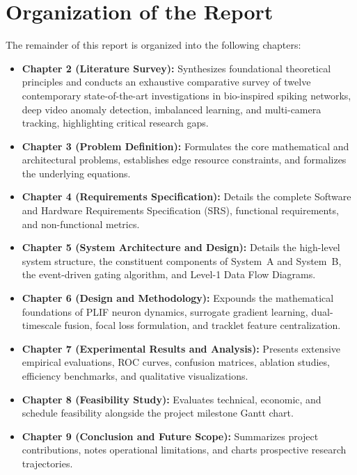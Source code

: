 \documentclass[12pt,a4paper]{report}
\begin{document}
\section{Organization of the Report}
The remainder of this report is organized into the following chapters:
\begin{itemize}
    \item \textbf{Chapter 2 (Literature Survey):} Synthesizes foundational theoretical principles and conducts an exhaustive comparative survey of twelve contemporary state-of-the-art investigations in bio-inspired spiking networks, deep video anomaly detection, imbalanced learning, and multi-camera tracking, highlighting critical research gaps.
    \item \textbf{Chapter 3 (Problem Definition):} Formulates the core mathematical and architectural problems, establishes edge resource constraints, and formalizes the underlying equations.
    \item \textbf{Chapter 4 (Requirements Specification):} Details the complete Software and Hardware Requirements Specification (SRS), functional requirements, and non-functional metrics.
    \item \textbf{Chapter 5 (System Architecture and Design):} Details the high-level system structure, the constituent components of System~A and System~B, the event-driven gating algorithm, and Level-1 Data Flow Diagrams.
    \item \textbf{Chapter 6 (Design and Methodology):} Expounds the mathematical foundations of PLIF neuron dynamics, surrogate gradient learning, dual-timescale fusion, focal loss formulation, and tracklet feature centralization.
    \item \textbf{Chapter 7 (Experimental Results and Analysis):} Presents extensive empirical evaluations, ROC curves, confusion matrices, ablation studies, efficiency benchmarks, and qualitative visualizations.
    \item \textbf{Chapter 8 (Feasibility Study):} Evaluates technical, economic, and schedule feasibility alongside the project milestone Gantt chart.
    \item \textbf{Chapter 9 (Conclusion and Future Scope):} Summarizes project contributions, notes operational limitations, and charts prospective research trajectories.
\end{itemize}


\end{document}
